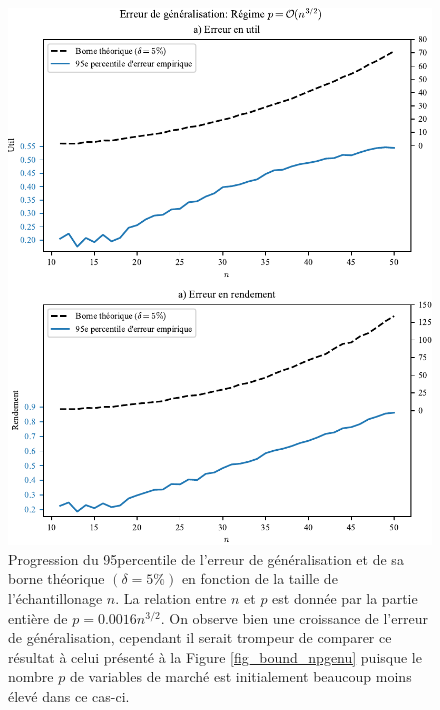 \begin{figure}[h!]
  \centering
  \includegraphics[width=\textwidth]{../experiments/fig/bound_np_np32.pdf}
  \caption{Progression du 95\ieme percentile de l'erreur de généralisation et de sa borne
    théorique $(\delta = 5\%)$ en fonction de la taille de l'échantillonage $n$. La relation
    entre $n$ et $p$ est donnée par la partie entière de $p = 0.0016n^{3/2}$. On observe
    bien une croissance de l'erreur de généralisation, cependant il serait trompeur de
    comparer ce résultat à celui présenté à la Figure \ref{fig_bound_npgenu} puisque le
    nombre $p$ de variables de marché est initialement beaucoup moins élevé dans ce
    cas-ci.}
  \label{fig_np_np32}
\end{figure}

